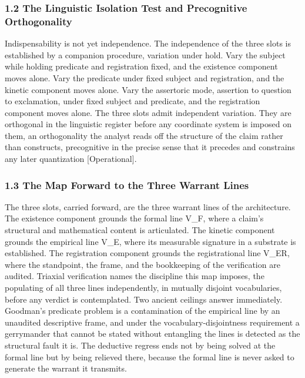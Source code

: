 \documentclass[10pt,twocolumn]{article}
\begin{document}
\hypertarget{the-linguistic-isolation-test-and-precognitive-orthogonality}{%
\subsubsection{1.2 The Linguistic Isolation Test and Precognitive
Orthogonality}\label{the-linguistic-isolation-test-and-precognitive-orthogonality}}

Indispensability is not yet independence. The independence of the three
slots is established by a companion procedure, variation under hold.
Vary the subject while holding predicate and registration fixed, and the
existence component moves alone. Vary the predicate under fixed subject
and registration, and the kinetic component moves alone. Vary the
assertoric mode, assertion to question to exclamation, under fixed
subject and predicate, and the registration component moves alone. The
three slots admit independent variation. They are orthogonal in the
linguistic register before any coordinate system is imposed on them, an
orthogonality the analyst reads off the structure of the claim rather
than constructs, precognitive in the precise sense that it precedes and
constrains any later quantization {[}Operational{]}.

\hypertarget{the-map-forward-to-the-three-warrant-lines}{%
\subsubsection{1.3 The Map Forward to the Three Warrant
Lines}\label{the-map-forward-to-the-three-warrant-lines}}

The three slots, carried forward, are the three warrant lines of the
architecture. The existence component grounds the formal line V\_F,
where a claim's structural and mathematical content is articulated. The
kinetic component grounds the empirical line V\_E, where its measurable
signature in a substrate is established. The registration component
grounds the registrational line V\_ER, where the standpoint, the frame,
and the bookkeeping of the verification are audited. Triaxial
verification names the discipline this map imposes, the populating of
all three lines independently, in mutually disjoint vocabularies, before
any verdict is contemplated. Two ancient ceilings answer immediately.
Goodman's predicate problem is a contamination of the empirical line by
an unaudited descriptive frame, and under the vocabulary-disjointness
requirement a gerrymander that cannot be stated without entangling the
lines is detected as the structural fault it is. The deductive regress
ends not by being solved at the formal line but by being relieved there,
because the formal line is never asked to generate the warrant it
transmits.
\end{document}
